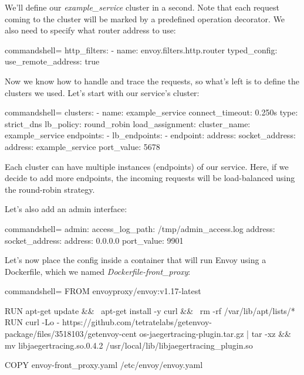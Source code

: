 We'll define our \textit{example\_service} cluster in a second. Note that each request coming to the cluster will be marked by a predefined operation decorator. We also need to specify what router address to use:

\begin{tcblisting}{commandshell={}}
http_filters:
- name: envoy.filters.http.router
  typed_config: {}
use_remote_address: true
\end{tcblisting}

Now we know how to handle and trace the requests, so what's left is to define the clusters we used. Let's start with our service's cluster:

\begin{tcblisting}{commandshell={}}
clusters:
  - name: example_service
    connect_timeout: 0.250s
    type: strict_dns
    lb_policy: round_robin
    load_assignment:
      cluster_name: example_service
      endpoints:
        - lb_endpoints:
        - endpoint:
            address:
              socket_address:
                address: example_service
                port_value: 5678
\end{tcblisting}

Each cluster can have multiple instances (endpoints) of our service. Here, if we decide to add more endpoints, the incoming requests will be load-balanced using the round-robin strategy.

Let's also add an admin interface:


\begin{tcblisting}{commandshell={}}
admin:
  access_log_path: /tmp/admin_access.log
  address:
   socket_address:
     address: 0.0.0.0
     port_value: 9901
\end{tcblisting}

Let's now place the config inside a container that will run Envoy using a Dockerfile, which we named \textit{Dockerfile-front\_proxy}:

\begin{tcblisting}{commandshell={}}
FROM envoyproxy/envoy:v1.17-latest

RUN apt-get update && \
apt-get install -y curl && \
rm -rf /var/lib/apt/lists/*
RUN curl -Lo -
https://github.com/tetratelabs/getenvoy-package/files/3518103/getenvoy-cent
os-jaegertracing-plugin.tar.gz | tar -xz && mv libjaegertracing.so.0.4.2
/usr/local/lib/libjaegertracing_plugin.so

COPY envoy-front_proxy.yaml /etc/envoy/envoy.yaml

\end{tcblisting}

